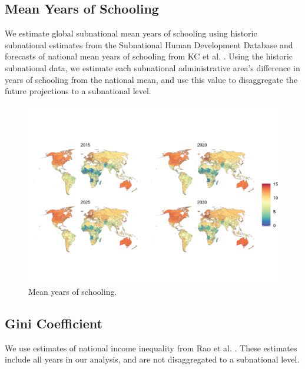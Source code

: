 \documentclass{article}
\begin{document}
\subsection{Mean Years of Schooling}
We estimate global subnational mean years of schooling using historic subnational estimates from the Subnational Human Development Database \cite{Smits2019} and forecasts of national mean years of schooling from KC et al. \cite{KC2017}.  Using the historic subnational data, we estimate each subnational administrative area's difference in years of schooling from the national mean, and use this value to disaggregate the future projections to a subnational level.


\begin{figure}[H]
  \centering
  \includegraphics[width=\linewidth]{img/covars/school_mean.png}
  \caption{Mean years of schooling.}
\end{figure}


\subsection{Gini Coefficient}
We use estimates of national income inequality from Rao et al. \citep{Rao2019a}.  These estimates include all years in our analysis, and are not disaggregated to a subnational level.
\end{document}

